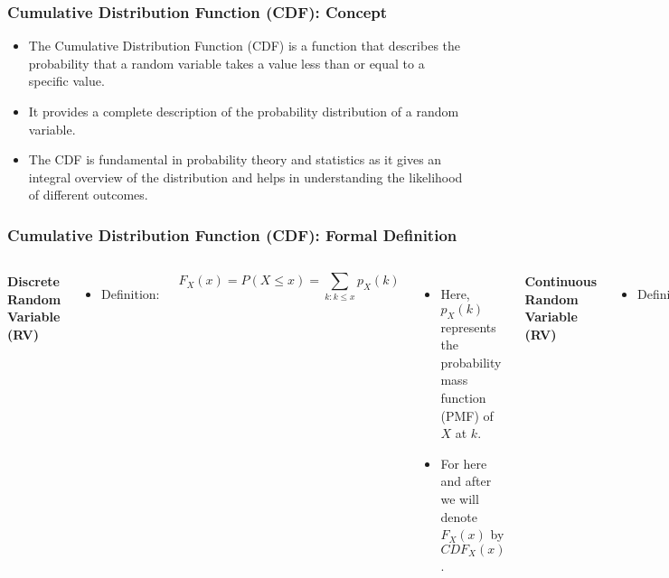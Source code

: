 \documentclass[handout]{beamer} %
\begin{document}
\begin{frame}
\frametitle{Cumulative Distribution Function (CDF): Concept}

\begin{itemize}
  \item The Cumulative Distribution Function (CDF) is a function that describes the probability that a random variable takes a value less than or equal to a specific value.
  \pause
  \item It provides a complete description of the probability distribution of a random variable.
  \pause
  \item The CDF is fundamental in probability theory and statistics as it gives an integral overview of the distribution and helps in understanding the likelihood of different outcomes.
\end{itemize}

\end{frame}

\begin{frame}
\frametitle{Cumulative Distribution Function (CDF): Formal Definition}

\begin{columns}

\textbf{Discrete Random Variable (RV)}
\begin{itemize}
    \item Definition: \vspace{0.7em}
\end{itemize}
  \pause
\small{\[
    F_X(x) = P(X \leq x) = \sum_{k: k \leq x} p_X(k)
\]}
  \pause
\begin{itemize}
    \item Here, $p_X(k)$ represents the probability mass function (PMF) of $X$ at $k$.
    \item For here and after we will denote $F_X(x)$ by $CDF_X(x)$.
\end{itemize}
  \pause

\vspace{-3em}
\textbf{Continuous Random Variable (RV)}
\begin{itemize}
    \item Definition:
  \pause
\end{itemize}
\small{
\[
  F_X(x) = P(X \leq x) = \int_{-\infty}^x f_X(t) \, dt
\]}
  \pause
\begin{itemize}
    \item $f_X(t)$ is the probability density function (PDF) of $X$.
    \item For here and after we will denote $F_X(x)$ by $CDF_X(x)$.
\end{itemize}

\end{columns}

\end{frame}
\end{document}
